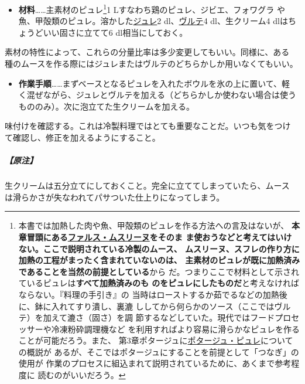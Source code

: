 \begin{recette}
\begin{itemize}
\tightlist
\item
  \textbf{材料}\ldots{}\ldots{}主素材のピュレ\footnote{本書では加熱した肉や魚、甲殻類のピュレを作る方法への言及はないが、
    \textbf{本章冒頭にある\protect\hyperlink{farce-mousseline}{ファルス・ムスリーヌ}をそのま
    ま使おうなどと考えてはいけない。ここで説明されている冷製のムース、
    ムスリーヌ、スフレの作り方に加熱の工程がまったく含まれていないのは、
    主素材のピュレが既に加熱済みであることを当然の前提としている}から
    だ。つまりここで材料として示されているピュレは\textbf{すべて加熱済みのも
    のをピュレにしたものだ}と考えなければならない。『料理の手引き』の
    当時はローストするか茹でるなどの加熱後に、鉢に入れてすり潰し、裏漉
    ししてから何らかのソース（ここではヴルテ）を加えて漉さ（固さ）を調
    節するなどしていた。現代ではフードプロセッサーや冷凍粉砕調理機など
    を利用すればより容易に滑らかなピュレを作ることが可能だろう。また、
    第3章ポタージュに\protect\hyperlink{les-purees}{ポタージュ・ピュレ}についての概説が
    あるが、そこではポタージュにすることを前提として「つなぎ」の使用が
    作業のプロセスに組込まれて説明されているために、あくまで参考程度に
    読むのがいいだろう。}1 Lすなわち鶏のピュレ、ジビエ、フォワグラ
  や魚、甲殻類のピュレ。溶かした\protect\hyperlink{gelees-ordinaires}{ジュレ}2\undemi{}
  dl、\protect\hyperlink{veloute}{ヴルテ}4 dl、生クリーム4
  dlはちょうどいい固さに立てて6 dl相当にしておく。
\end{itemize}

素材の特性によって、これらの分量比率は多少変更してもいい。同様に、ある
種のムースを作る際にはジュレまたはヴルテのどちらかしか用いなくてもいい。

\begin{itemize}
\tightlist
\item
  \textbf{作業手順}\ldots{}\ldots{}まずベースとなるピュレを入れたボウルを氷の上に置いて、軽
  く混ぜながら、ジュレとヴルテを加える（どちらかしか使わない場合は使う
  もののみ）。次に泡立てた生クリームを加える。
\end{itemize}

味付けを確認する。これは冷製料理ではとても重要なことだ。いつも気をつけ
て確認し、修正を加えるようにすること。

\hypertarget{nota-composition-de-l-appareil-pour-mousses-et-mousseline-froides}{%
\subparagraph{【原注】}\label{nota-composition-de-l-appareil-pour-mousses-et-mousseline-froides}}

生クリームは五分立てにしておくこと。完全に立ててしまっていたら、ムース
は滑らかさが失なわれてパサついた仕上りになってしまう。


\end{recette}

